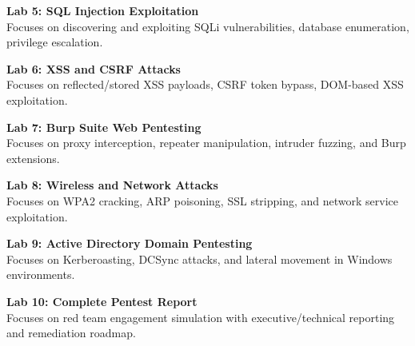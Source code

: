 \vspace{0.2cm}

\noindent\textbf{Lab 5: SQL Injection Exploitation} \\
Focuses on discovering and exploiting SQLi vulnerabilities, database enumeration, privilege escalation.

\vspace{0.2cm}

\noindent\textbf{Lab 6: XSS and CSRF Attacks} \\
Focuses on reflected/stored XSS payloads, CSRF token bypass, DOM-based XSS exploitation.

\vspace{0.2cm}

\noindent\textbf{Lab 7: Burp Suite Web Pentesting} \\
Focuses on proxy interception, repeater manipulation, intruder fuzzing, and Burp extensions.

\vspace{0.2cm}

\noindent\textbf{Lab 8: Wireless and Network Attacks} \\
Focuses on WPA2 cracking, ARP poisoning, SSL stripping, and network service exploitation.

\vspace{0.2cm}

\noindent\textbf{Lab 9: Active Directory Domain Pentesting} \\
Focuses on Kerberoasting, DCSync attacks, and lateral movement in Windows environments.

\vspace{0.2cm}

\noindent\textbf{Lab 10: Complete Pentest Report} \\
Focuses on red team engagement simulation with executive/technical reporting and remediation roadmap.

\vspace{0.2cm}

\newpage
{}
